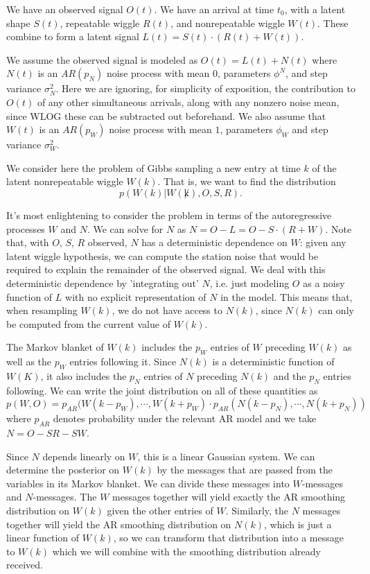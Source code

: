 \documentclass{article}
\begin{document}
We have an observed signal $O(t)$. We have an arrival at time $t_0$, with a latent shape $S(t)$, repeatable wiggle $R(t)$, and nonrepeatable wiggle $W(t)$. These combine to form a latent signal $L(t) = S(t) \cdot (R(t) + W(t))$.

We assume the observed signal is modeled as $O(t) = L(t) + N(t)$ where $N(t)$ is an $AR(p_N)$ noise process with mean $0$, parameters $\phi^N$, and step variance $\sigma^2_N$. Here we are ignoring, for simplicity of exposition, the contribution to $O(t)$ of any other simultaneous arrivals, along with any nonzero noise mean, since WLOG these can be subtracted out beforehand. We also assume that $W(t)$ is an $AR(p_W)$ noise process with mean $1$, parameters $\phi_W$ and step variance $\sigma^2_W$.

We consider here the problem of Gibbs sampling a new entry at time $k$ of the latent nonrepeatable wiggle $W(k)$. That is, we want to find the distribution
\[p(W(k) | W(\not k), O, S, R).\]

It's most enlightening to consider the problem in terms of the autoregressive processes $W$ and $N$. We can solve for $N$ as $N = O - L = O - S \cdot (R + W)$. Note that, with $O$, $S$, $R$ observed, $N$ has a deterministic dependence on $W$: given any latent wiggle hypothesis, we can compute the station noise that would be required to explain the remainder of the observed signal. We deal with this deterministic dependence by 'integrating out' $N$, i.e. just modeling $O$ as a noisy function of $L$ with no explicit representation of $N$ in the model. This means that, when resampling $W(k)$, we do not have access to $N(k)$, since $N(k)$ can only be computed from the current value of $W(k)$.

The Markov blanket of $W(k)$ includes the $p_W$ entries of $W$ preceding $W(k)$ as well as the $p_W$ entries following it. Since $N(k)$ is a deterministic function of $W(K)$, it also includes the $p_N$ entries of $N$ preceding $N(k)$ and the $p_N$ entries following. We can write the joint distribution on all of these quantities as
\[p(W,O) = p_{AR}(W(k-p_W), \cdots, W(k+p_W) \cdot p_{AR}(N(k-p_N), \cdots, N(k+p_N))\]
where $p_{AR}$ denotes probability under the relevant AR model and we take $N = O - SR - SW$.

Since $N$ depends linearly on $W$, this is a linear Gaussian system. We can determine the posterior on $W(k)$ by the messages that are passed from the variables in its Markov blanket. We can divide these messages into $W$-messages and $N$-messages. The $W$ messages together will yield exactly the AR smoothing distribution on $W(k)$ given the other entries of $W$. Similarly, the $N$ messages together will yield the AR smoothing distribution on $N(k)$, which is just a linear function of $W(k)$, so we can transform that distribution into a message to $W(k)$ which we will combine with the smoothing distribution already received.
\end{document}
